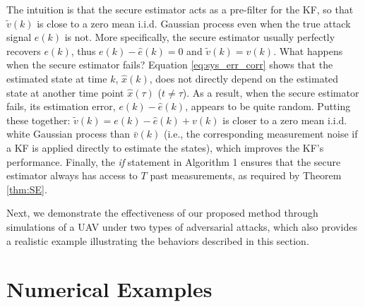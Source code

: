 \documentclass[../../thesis.tex]{subfiles}
\begin{document}
The intuition is that the secure estimator acts as a pre-filter for the KF, so that $\tilde v(k)$ is close to a zero mean i.i.d. Gaussian process even when the true attack signal $e(k)$ is not. 
More specifically, the secure estimator usually perfectly recovers $e(k)$, thus $e(k) - \hat e(k) = 0$ and $\tilde v(k) = v(k)$. 
What happens when the secure estimator fails? 
Equation \eqref{eq:sys_err_corr} shows that the estimated state at time $k$, $\hat x(k)$, does not directly depend on the estimated state at another time point $\hat x(\tau)$ ($t \neq \tau$).
As a result, when the secure estimator fails, its estimation error, $e(k) - \hat e(k)$, appears to be quite random. 
Putting these together: $\tilde v(k) = e(k) - \hat e(k) + v(k)$ is closer to a zero mean i.i.d. white Gaussian process than $\bar v(k)$ (i.e., the corresponding measurement noise if a KF is applied directly to estimate the states), which improves the KF's performance.
Finally, the \textit{if} statement in Algorithm 1 ensures that the secure estimator always has access to $T$ past measurements, as required by Theorem \ref{thm:SE}.

Next, we demonstrate the effectiveness of our proposed method through simulations of a UAV under two types of adversarial attacks, which also provides a realistic example illustrating the behaviors described in this section.








 







\section{Numerical Examples}\label{sec:examples}
\end{document}
